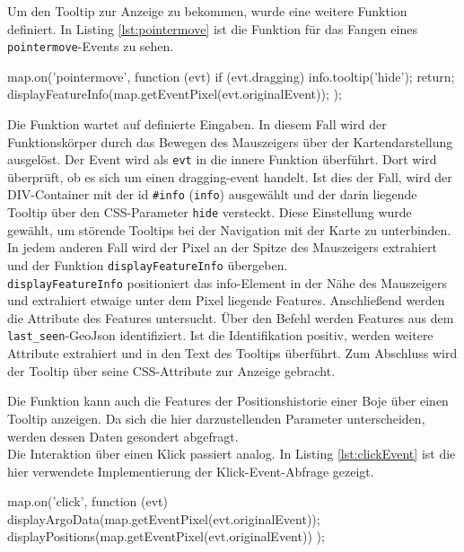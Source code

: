 Um den Tooltip zur Anzeige zu bekommen, wurde eine weitere Funktion definiert. In Listing \ref{lst:pointermove} ist die Funktion für das Fangen eines \texttt{pointermove}-Events zu sehen.
\begin{javascript}[label={lst:pointermove}, caption={Das Abfangen eines pointermove-Events}]
map.on('pointermove', function (evt) {
    if (evt.dragging) {
        info.tooltip('hide');
        return;
    }
    displayFeatureInfo(map.getEventPixel(evt.originalEvent));
});
\end{javascript}

Die Funktion wartet auf definierte Eingaben. In diesem Fall wird der Funktionskörper durch das Bewegen des Mauszeigers über der Kartendarstellung ausgelöst. Der Event wird als \texttt{evt} in die innere Funktion überführt. Dort wird überprüft, ob es sich um einen dragging-event handelt. Ist dies der Fall, wird der DIV-Container mit der id \texttt{\#info} (\texttt{info}) ausgewählt und der darin liegende Tooltip über den CSS-Parameter \texttt{hide} versteckt. Diese Einstellung wurde gewählt, um störende Tooltips bei der Navigation mit der Karte zu unterbinden. In jedem anderen Fall wird der Pixel an der Spitze des Mauszeigers extrahiert und der Funktion \texttt{displayFeatureInfo} übergeben.
\\
\texttt{displayFeatureInfo} positioniert das info-Element in der Nähe des Mauszeigers und extrahiert etwaige unter dem Pixel liegende Features. Anschließend werden die Attribute des Features untersucht. Über den Befehl  werden Features aus dem \texttt{last\_seen}-GeoJson identifiziert. Ist die Identifikation positiv, werden weitere Attribute extrahiert und in den Text des Tooltips überführt. Zum Abschluss wird der Tooltip über seine CSS-Attribute zur Anzeige gebracht.

Die Funktion kann auch die Features der Positionshistorie einer Boje über einen Tooltip anzeigen. Da sich die hier darzustellenden Parameter unterscheiden, werden dessen Daten gesondert abgefragt.
\\

Die Interaktion über einen Klick passiert analog. In Listing \ref{lst:clickEvent} ist die hier verwendete Implementierung der Klick-Event-Abfrage gezeigt.
\begin{javascript}[label={lst:clickEvent}, caption={Das Abfangen eines Klick-Events}]
map.on('click', function (evt) {
    displayArgoData(map.getEventPixel(evt.originalEvent));
    displayPositions(map.getEventPixel(evt.originalEvent))
});
\end{javascript}

